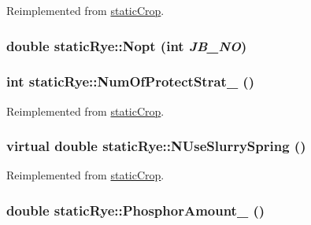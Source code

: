 Reimplemented from \hyperlink{classstatic_crop_a32b69ed138beaed150efa74d18e82d8e}{staticCrop}.\hypertarget{classstatic_rye_a4255082b0ac988eaaf8020e5cbb6caab}{
\subsubsection[{Nopt}]{\setlength{\rightskip}{0pt plus 5cm}double staticRye::Nopt (int {\em JB\_\-NO})}}
\label{classstatic_rye_a4255082b0ac988eaaf8020e5cbb6caab}
\hypertarget{classstatic_rye_ac293d50ad067e382400530df8bcead56}{
\subsubsection[{NumOfProtectStrat\_\-}]{\setlength{\rightskip}{0pt plus 5cm}int staticRye::NumOfProtectStrat\_\- ()}}
\label{classstatic_rye_ac293d50ad067e382400530df8bcead56}


Reimplemented from \hyperlink{classstatic_crop_a4d3d767f569f48eb68ffa76822302467}{staticCrop}.\hypertarget{classstatic_rye_af3bbe1562e3361dbfa02b186d11a810a}{
\subsubsection[{NUseSlurrySpring}]{\setlength{\rightskip}{0pt plus 5cm}virtual double staticRye::NUseSlurrySpring ()}}
\label{classstatic_rye_af3bbe1562e3361dbfa02b186d11a810a}


Reimplemented from \hyperlink{classstatic_crop_ae7d21ab4afc8d8355d231566e8d87b1b}{staticCrop}.\hypertarget{classstatic_rye_a29a2a89b2cb2d8e47ee6b7881560b0f4}{
\subsubsection[{PhosphorAmount\_\-}]{\setlength{\rightskip}{0pt plus 5cm}double staticRye::PhosphorAmount\_\- ()}}
\label{classstatic_rye_a29a2a89b2cb2d8e47ee6b7881560b0f4}


